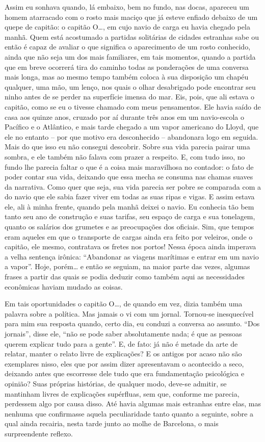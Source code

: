 Assim eu sonhava quando, lá embaixo, bem no fundo, nas docas, apareceu
um homem atarracado com o rosto mais maciço que já esteve enfiado
debaixo de um quepe de capitão: o capitão O\ldots{}, em cujo navio de carga
eu havia chegado pela manhã. Quem está acostumado a partidas solitárias
de cidades estranhas sabe ou então é capaz de avaliar o que significa o
aparecimento de um rosto conhecido, ainda que não seja um dos mais
familiares, em tais momentos, quando a partida que em breve ocorrerá
tira do caminho todas as ponderações de uma conversa mais longa, mas ao
mesmo tempo também coloca à sua disposição um chapéu qualquer, uma mão,
um lenço, nos quais o olhar desabrigado pode encontrar seu ninho antes
de se perder na superfície imensa do mar. Eis, pois, que ali estava o
capitão, como se eu o tivesse chamado com meus pensamentos. Ele havia
saído de casa aos quinze anos, cruzado por aí durante três anos em um
navio-escola o Pacífico e o Atlântico, e mais tarde chegado a um vapor
americano do Lloyd, que ele no entanto -- por que motivo era
desconhecido -- abandonara logo em seguida. Mais do que isso eu não
consegui descobrir. Sobre sua vida parecia pairar uma sombra, e ele
também não falava com prazer a respeito. E, com tudo isso, no fundo lhe
parecia faltar o que é a coisa mais maravilhosa no contador: o fato de
poder contar sua vida, deixando que essa mecha se consuma nas chamas
suaves da narrativa. Como quer que seja, sua vida parecia ser pobre se
comparada com a do navio que ele sabia fazer viver em todas as suas
ripas e vigas. E assim estava ele, ali à minha frente, quando pela manhã
deixei o navio. Eu conhecia tão bem tanto seu ano de construção e suas
tarifas, seu espaço de carga e sua tonelagem, quanto os salários dos
grumetes e as preocupações dos oficiais. Sim, que tempos eram aqueles em
que o transporte de cargas ainda era feito por veleiros, onde o capitão,
ele mesmo, contratava os fretes nos portos! Nessa época ainda imperava a
velha sentença irônica: ``Abandonar as viagens marítimas e entrar em um
navio a vapor''. Hoje, porém\ldots{} e então se seguiam, na maior parte das
vezes, algumas frases a partir das quais se podia deduzir como também
aqui as necessidades econômicas haviam mudado as coisas.

Em tais oportunidades o capitão O\ldots{}, de quando em vez, dizia também uma
palavra sobre a política. Mas jamais o vi com um jornal. Tornou-se
inesquecível para mim sua resposta quando, certo dia, eu conduzi a
conversa ao assunto. ``Dos jornais'', disse ele, ``não se pode saber
absolutamente nada; é que as pessoas querem explicar tudo para a
gente''. E, de fato: já não é metade da arte de relatar, manter o relato
livre de explicações? E os antigos por acaso não são exemplares nisso,
eles que por assim dizer apresentavam o acontecido a seco, deixando
antes que escorresse dele tudo que era fundamentação psicológica e
opinião? Suas próprias histórias, de qualquer modo, deve-se admitir, se
mantinham livres de explicações supérfluas, sem que, conforme me
parecia, perdessem algo por causa disso. Até havia algumas mais
estranhas entre elas, mas nenhuma que confirmasse aquela peculiaridade
tanto quanto a seguinte, sobre a qual ainda recairia, nesta tarde junto
ao molhe de Barcelona, o mais surpreendente reflexo.

